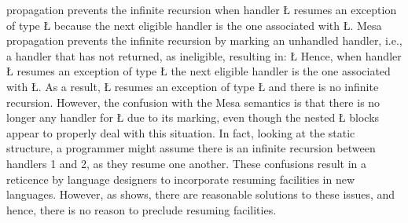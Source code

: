 \documentclass[openright,twoside]{report}
\begin{document}
\uC propagation prevents the infinite recursion when handler \LGinlinetrue\LGbegin\lgrinde\L{}\endlgrinde\LGend{} resumes an exception of type \LGinlinetrue\LGbegin\lgrinde\L{}\endlgrinde\LGend{} because the next eligible handler is the one associated with \LGinlinetrue\LGbegin\lgrinde\L{}\endlgrinde\LGend{}.
Mesa propagation prevents the infinite recursion by marking an unhandled handler, i.e., a handler that has not returned, as ineligible, resulting in:
\LGinlinefalse\LGbegin\lgrinde
\L{}
\endlgrinde\LGend
Hence, when handler \LGinlinetrue\LGbegin\lgrinde\L{}\endlgrinde\LGend{} resumes an exception of type \LGinlinetrue\LGbegin\lgrinde\L{}\endlgrinde\LGend{} the next eligible handler is the one associated with \LGinlinetrue\LGbegin\lgrinde\L{}\endlgrinde\LGend{}.
As a result, \LGinlinetrue\LGbegin\lgrinde\L{}\endlgrinde\LGend{} resumes an exception of type \LGinlinetrue\LGbegin\lgrinde\L{}\endlgrinde\LGend{} and there is no infinite recursion.
However, the confusion with the Mesa semantics is that there is no longer any handler for \LGinlinetrue\LGbegin\lgrinde\L{}\endlgrinde\LGend{} due to its marking, even though the nested \LGinlinetrue\LGbegin\lgrinde\L{}\endlgrinde\LGend{} blocks appear to properly deal with this situation.
In fact, looking at the static structure, a programmer might assume there is an infinite recursion between handlers 1 and 2, as they resume one another.
These confusions result in a reticence by language designers to incorporate resuming facilities in new languages.
However, as \uC shows, there are reasonable solutions to these issues, and hence, there is no reason to preclude resuming facilities.
\end{document}
